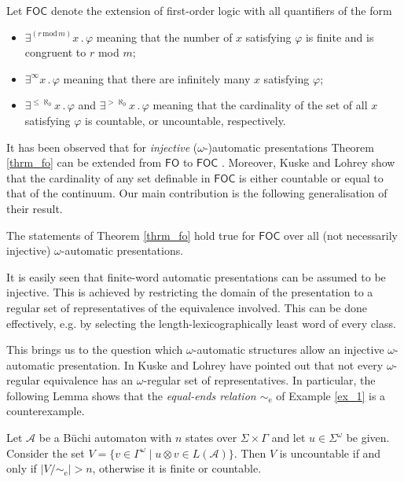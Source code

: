 \documentclass{stacs_proc}
\newcommand{\FO}{\mathsf{FO}}
\newcommand{\FOC}{\mathsf{FOC}}
\newcommand{\eqe}{\sim_{\textrm{e}}}
\newcommand{\calA}{\mathcal{A}}
\begin{document}
Let $\FOC$ denote the extension of first-order logic with all quantifiers 
of the form 
\begin{itemize}
\item $\exists^{(r\,\mathrm{mod}\,m)} x \, . \, \varphi$ 
      meaning that the number of $x$ satisfying $\varphi$ is finite 
      and is congruent to $r$ mod $m$; 
\item $\exists^\infty x \, . \, \varphi$ 
      meaning that there are infinitely many $x$ satisfying $\varphi$;
\item $\exists^{\leq \aleph_0} x \, . \, \varphi$ and $\exists^{>\aleph_0} x  \, . \, \varphi$
      meaning that the cardinality of the set of all $x$ satisfying $\varphi$
      is countable, or uncountable, respectively.
\end{itemize}
It has been observed that for \emph{injective} ($\omega$-)automatic 
presentations Theorem \ref{thrm_fo} can be extended from $\FO$ to $\FOC$ \cite{KRS04,KL06}.
Moreover, Kuske and Lohrey show that the cardinality of any set definable 
in $\FOC$ is either countable or equal to that of the continuum.
Our main contribution is the following generalisation of their result.

\begin{theorem} \label{thrm_foc}
The statements of Theorem \ref{thrm_fo} hold true for $\FOC$ over all
(not necessarily injective) $\omega$-automatic presentations.
\end{theorem}

It is easily seen that finite-word automatic presentations can be assumed to be
injective. 
This is achieved by restricting the domain of the presentation to a regular set
of representatives of the equivalence involved.  This can be done effectively,
e.g. by selecting the length-lexicographically least word of every class.

This brings us to the question which $\omega$-automatic structures allow 
an injective $\omega$-automatic presentation.
In \cite{KL06} Kuske and Lohrey have pointed out that not every
$\omega$-regular equivalence has an $\omega$-regular set of representatives.
In particular, the following Lemma shows that the \emph{equal-ends relation
$\eqe$} of Example \ref{ex_1} is a counterexample.

\begin{lemma}[{\cite[Lemma 2.4]{KL06}}] \label{lemma_KL}
Let $\calA$ be a B\"uchi automaton
with $n$ states over $\Sigma \times \Gamma$ and let $u \in \Sigma^\omega$ be given.
Consider the set $V = \{ v \in \Gamma^\omega \mid u \otimes v \in L(\calA) \}$.  
Then $V$ is uncountable if and only if $|V / \eqe | > n$, otherwise it is finite
or countable.
\end{lemma}
\end{document}
